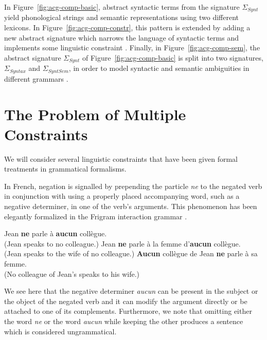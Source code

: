 \documentclass{llncs}
\begin{document}
In Figure~\ref{fig:acg-comp-basic}, abstract syntactic terms from the
signature $\Sigma_{Synt}$ yield phonological strings and semantic
representations using two different lexicons. In
Figure~\ref{fig:acg-comp-constr}, this pattern is extended by adding a
new abstract signature which narrows the language of syntactic terms and
implements some linguistic constraint
\cite{pogodalla2012controlling}. Finally, in
Figure~\ref{fig:acg-comp-sem}, the abstract signature $\Sigma_{Synt}$ of
Figure~\ref{fig:acg-comp-basic} is split into two signatures,
$\Sigma_{Syntax}$ and $\Sigma_{SyntSem}$, in order to model syntactic
and semantic ambiguities in different grammars
\cite{pogodalla2007generalizing}.


\section{The Problem of Multiple Constraints}
\label{sec:constraints}

We will consider several linguistic constraints that have been given
formal treatments in grammatical formalisms.

In French, negation is signalled by prepending the particle \emph{ne} to the
negated verb in conjunction with using a properly placed accompanying word,
such as a negative determiner, in one of the verb's arguments. This phenomenon
has been elegantly formalized in the Frigram interaction grammar
\cite{perrier2007french}.

\begin{exe}
  \ex \label{ex:aucun-shallow} Jean \textbf{ne} parle à \textbf{aucun} collègue. \\
      (Jean speaks to no colleague.)
  \ex \label{ex:aucun-deep-obj} Jean \textbf{ne} parle à la femme d'\textbf{aucun} collègue. \\
      (Jean speaks to the wife of no colleague.)
  \ex \label{ex:aucun-deep-subj} \textbf{Aucun} collègue de Jean \textbf{ne} parle à sa femme. \\
      (No colleague of Jean's speaks to his wife.)
\end{exe}

We see here that the negative determiner \emph{aucun} can be present in
the subject or the object of the negated verb and it can modify the
argument directly or be attached to one of its complements. Furthermore,
we note that omitting either the word \emph{ne} or the word \emph{aucun}
while keeping the other produces a sentence which is considered
ungrammatical.
\end{document}
